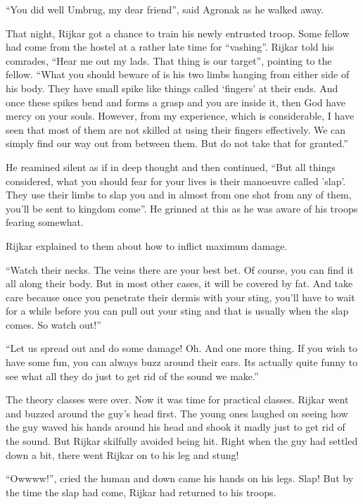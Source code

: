 \documentclass[twoside,11pt]{article}
\begin{document}
``You did well Umbrug, my dear friend'', said Agronak as he walked away.

That night, Rijkar got a chance to train his newly entrusted troop. Some fellow had come from the hostel at a rather late time for ``vashing''. Rijkar told his comrades, ``Hear me out my lads. That thing is our target'', pointing to the fellow. ``What you should beware of is his two limbs hanging from either side of his body. They have small spike like things called `fingers' at their ends. And once these spikes bend and forms a grasp and you are inside it, then God have mercy on your souls. However, from my experience, which is considerable, I have seen that most of them are not skilled at using their fingers effectively. We can simply find our way out from between them. But do not take that for granted.''

He reamined silent as if in deep thought and then continued, ``But all things considered, what you should fear for your lives is their manoeuvre called 'slap'. They use their limbs to slap you and in almost from one shot from any of them, you'll be sent to kingdom come''. He grinned at this as he was aware of his troops fearing somewhat.

Rijkar explained to them about how to inflict maximum damage.

``Watch their necks. The veins there are your best bet. Of course, you can find it all along their body. But in most other cases, it will be covered by fat. And take care because once you penetrate their dermis with your sting, you'll have to wait for a while before you can pull out your sting and that is usually when the slap comes. So watch out!''

``Let us spread out and do some damage! Oh. And one more thing. If you wish to have some fun, you can always buzz around their ears. Its actually quite funny to see what all they do just to get rid of the sound we make.''

The theory classes were over. Now it was time for practical classes. Rijkar went and buzzed around the guy's head first. The young ones laughed on seeing how the guy waved his hands around his head and shook it madly just to get rid of the sound. But Rijkar skilfully avoided being hit. Right when the guy had settled down a bit, there went Rijkar on to his leg and stung!

``Owwww!'', cried the human and down came his hands on his legs. Slap! But by the time the slap had come, Rijkar had returned to his troops.
\end{document}
